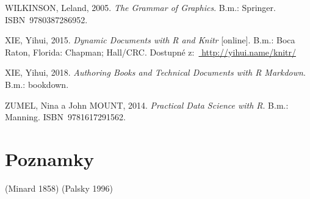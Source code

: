 \documentclass[12pt,]{article}
\begin{document}
\hypertarget{ref-wilkinson2005}{}
WILKINSON, Leland, 2005. \emph{The Grammar of Graphics}. B.m.: Springer.
ISBN~9780387286952.

\hypertarget{ref-knitr}{}
XIE, Yihui, 2015. \emph{Dynamic Documents with R and Knitr}
{[}online{]}. B.m.: Boca Raton, Florida: Chapman; Hall/CRC. Dostupné
z:~\href{\%20http://yihui.name/knitr/}{ http://yihui.name/knitr/}

\hypertarget{ref-rmd:bookdown}{}
XIE, Yihui, 2018. \emph{Authoring Books and Technical Documents with R
Markdown}. B.m.: bookdown.

\hypertarget{ref-zumel_2014}{}
ZUMEL, Nina a John MOUNT, 2014. \emph{Practical Data Science with R}.
B.m.: Manning. ISBN~9781617291562.

\newpage

\section*{Poznamky}

\thispagestyle{empty}

(Minard 1858) (Palsky 1996)
\end{document}
